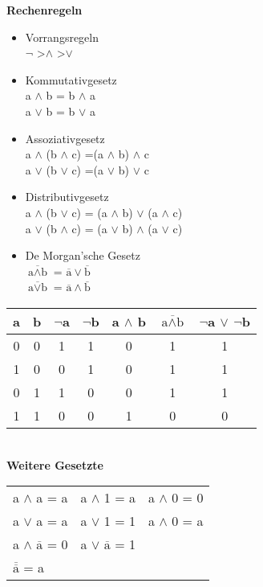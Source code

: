 \textbf{Rechenregeln} \\
\begin{itemize}
	\item Vorrangsregeln\\
	$\lnot$ \textgreater $\land$ \textgreater $\lor$
	\item Kommutativgesetz \\
	a $\land$ b = b $\land$ a \\
	a $\lor$ b = b $\lor$ a 
	\item Assoziativgesetz \\
	a $\land$ (b $\land$ c) =(a $\land$ b) $\land$ c \\
	a $\lor$ (b $\lor$ c) =(a $\lor$ b) $\lor$ c
	\item Distributivgesetz \\
	a $\land$ (b $\lor$ c) = (a $\land$ b) $\lor$ (a $\land$ c) \\
	a $\lor$ (b $\land$ c) = (a $\lor$ b) $\land$ (a $\lor$ c)
	\item De Morgan'sche Gesetz \\
	$\overline{\text{a}\land\text{b}}$ = $\overline{\text{a}} \lor \overline{\text{b}}$ \\
	$\overline{\text{a}\lor\text{b}}$ = $\overline{\text{a}} \land \overline{\text{b}}$ 
\end{itemize}

\begin{tabular}{c|c|c|c||c||c||c}
	a & b & $\lnot$a & $\lnot$b & a $\land$ b & $\overline{\text{a}\land\text{b}}$ & $\lnot$a $\lor$ $\lnot$b \\
	\hline
	0 & 0 & 1 & 1 & 0 & 1 & 1 \\
	1 & 0 & 0 & 1 & 0 & 1 & 1 \\
	0 & 1 & 1 & 0 & 0 & 1 & 1 \\
	1 & 1 & 0 & 0 & 1 & 0 & 0 \\
\end{tabular} \\

\textbf{Weitere Gesetzte} \\
\begin{tabular}{p{} p{} p{}} 
	a $\land$ a = a & a $\land$ 1 = a & a $\land$ 0 = 0 \\
	a $\lor$ a = a & a $\lor$ 1 = 1 & a $\land$ 0 = a \\
	a $\land$ $\overline{\text{a}}$ = 0 & a $\lor$ $\overline{\text{a}}$ = 1 & \\
	$\overline{\overline{\text{a}}}$ = a & & \\
\end{tabular} 

